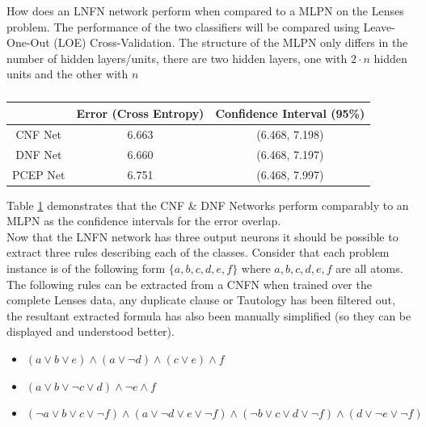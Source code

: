 How does an LNFN network perform when compared to a MLPN on the Lenses problem. The performance of the two classifiers will be compared using Leave-One-Out (LOE) Cross-Validation. The structure of the MLPN only differs in the number of hidden layers/units, there are two hidden layers, one with $2 \cdot n$ hidden units and the other with $n$

\begin{table}[H]
	\begin{center}
		\begin{tabular}{| c | c | c |}
			\hline
			& Error (Cross Entropy) & Confidence Interval (95\%) \\
			\hline
			CNF Net & 6.663 & (6.468, 7.198) \\
			\hline
			DNF Net & 6.660 & (6.468, 7.197) \\
			\hline
			PCEP Net & 6.751 & (6.468, 7.997) \\
			\hline
		\end{tabular}
	\end{center}
	\caption{}
	\label{tab:lenses-peformance-comp}
\end{table}

Table \ref{tab:lenses-peformance-comp} demonstrates that the CNF \& DNF Networks perform comparably to an MLPN as the confidence intervals for the error overlap.\\ 

Now that the LNFN network has three output neurons it should be possible to extract three rules describing each of the classes. Consider that each problem instance is of the following form $\{a, b, c, d, e, f\}$ where $a,b,c,d,e,f$ are all atoms. The following rules can be extracted from a CNFN when trained over the complete Lenses data, any duplicate clause or Tautology has been filtered out, the resultant extracted formula has also been manually simplified (so they can be displayed and understood better).

\begin{itemize}
	\item {} $(a \lor b \lor e) \land (a \lor \lnot d) \land (c \lor e) \land f$
	\item {} $(a \lor b \lor \lnot c \lor d) \land \lnot e \land f$
	\item {} $(\lnot a \lor b \lor c \lor \lnot f) \land (a \lor \lnot d \lor e \lor \lnot f) \land (\lnot b \lor c \lor d \lor \lnot f) \land (d \lor \lnot e \lor \lnot f)$
\end{itemize}

